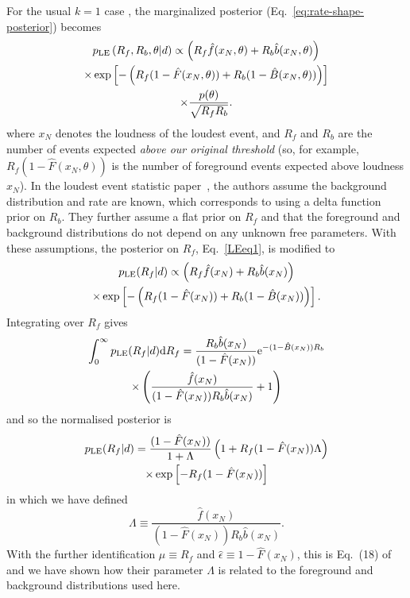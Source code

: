 \documentclass[aps,prd,reprint,nofootinbib]{revtex4-1}
\begin{document}
For the usual $k=1$ case \citep{Biswas2009}, the marginalized
posterior (Eq.~\eqref{eq:rate-shape-posterior}) becomes
\begin{multline}\label{LEeq1}
p_{\rm LE}\left( R_f, R_b, \theta | d \right) \propto \left(R_f
\hat{f}(x_N,\theta) + R_b \hat{b}(x_N,\theta)\right) \\ \times \exp\left[-\left(
  R_f (1-\hat{F}(x_N,\theta)) + R_b (1-\hat{B}(x_N,\theta)) \right)
  \right] \\ \times \frac{p(\theta)}{\sqrt{R_f R_b}}.
\end{multline}
where $x_N$ denotes the loudness of the loudest event, and $R_f$ and
$R_b$ are the number of events expected \emph{above our original
  threshold} (so, for example, $R_f (1 - \hat{F}(x_N,\theta))$ is the
number of foreground events expected above loudness $x_N$).  In the
loudest event statistic paper~\citep{Biswas2009}, the authors assume
the background distribution and rate are known, which corresponds to
using a delta function prior on $R_b$. They further assume a flat
prior on $R_f$ and that the foreground and background distributions do
not depend on any unknown free parameters. With these assumptions, the
posterior on $R_f$, Eq.~\eqref{LEeq1}, is modified to
\begin{multline}
p_{\rm LE}(R_f|d) \propto  \left(R_f
\hat{f}(x_N) + R_b \hat{b}(x_N)\right) \\ \times \exp\left[-\left(
  R_f (1-\hat{F}(x_N)) + R_b (1-\hat{B}(x_N)) \right)
  \right] .
\end{multline}
Integrating over $R_f$ gives
\begin{multline}
\int_0^\infty p_{\rm LE}(R_f|d) {\rm d}R_f =  \frac{R_b \hat{b}(x_N)}{(1-\hat{F}(x_N))} {\rm e}^{-(1-\hat{B}(x_N)) R_b}\\
\times \left(\frac{\hat{f}(x_N)}{(1-\hat{F}(x_N)) R_b \hat{b}(x_N)} + 1 \right)
\end{multline}
and so the normalised posterior is
\begin{multline}
p_{\rm LE}(R_f|d) = \frac{(1-\hat{F}(x_N))}{1+\Lambda} \left( 1+ R_f (1-\hat{F}(x_N))\Lambda \right) \\
\times \exp\left[-R_f (1-\hat{F}(x_N))\right]
\end{multline}
in which we have defined
\begin{equation}
\Lambda \equiv \frac{\hat{f}(x_N)}{(1-\hat{F}(x_N)) R_b \hat{b}(x_N)}.
\end{equation}
With the further identification $\mu \equiv R_f$ and $\hat{\epsilon} \equiv 1 - \hat{F}(x_N)$, this is Eq.~(18) of~\citep{Biswas2009} and we have shown how their parameter $\Lambda$ is related to the foreground and background distributions used here.
\end{document}
